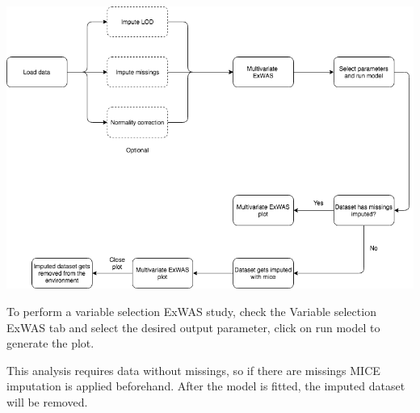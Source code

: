 \documentclass[
]{book}
\begin{document}
\includegraphics{images/analysis8_1.png}

To perform a variable selection ExWAS study, check the Variable selection ExWAS tab and select the desired output parameter, click on run model to generate the plot.

This analysis requires data without missings, so if there are missings MICE imputation is applied beforehand. After the model is fitted, the imputed dataset will be removed.
\end{document}
